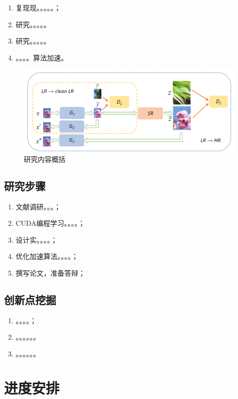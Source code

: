 \documentclass[UTF8,a4paper,11pt]{ctexart}
\begin{document}
\begin{sloppypar}
\begin{enumerate}
		\item 复现现。。。。。；
		\item 研究。。。。。
		\item 研究。。。。。
		\item 。。。。算法加速。
	\end{enumerate}
	\begin{figure}[htbp]
		\centering
		\includegraphics[width=14cm]{./image/GAN.png}
		\caption{研究内容概括}
		\label{fig:label}
	\end{figure}
	
	\subsection{研究步骤}
	\begin{enumerate}
		\item 文献调研。。。；
		\item CUDA编程学习。。。。；
		\item 设计实。。。。；
		\item 优化加速算法。。。。；
		\item 撰写论文，准备答辩；
	\end{enumerate}
	\subsection{创新点挖掘}
	\begin{enumerate}
		\item 。。。。；
		\item 。。。。。。
		\item 。。。。。。
	\end{enumerate}
	
	\section{进度安排}
	

\end{sloppypar}
\end{document}
